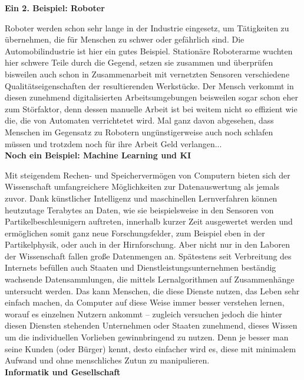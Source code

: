 {    

    \textbf{Ein 2. Beispiel: Roboter}

    Roboter werden schon sehr lange in der Industrie eingesetz, um Tätigkeiten zu übernehmen, die für Menschen zu schwer oder gefährlich sind. Die Automobilindustrie ist hier ein gutes Beispiel. Stationäre Roboterarme wuchten hier schwere Teile durch die Gegend, setzen sie zusammen und überprüfen bisweilen auch schon in Zusammenarbeit mit vernetzten Sensoren verschiedene Qualitätseigenschaften der resultierenden Werkstücke. Der Mensch verkommt in diesen zunehmend digitalisierten Arbeitsumgebungen beisweilen sogar schon eher zum Störfaktor, denn dessen manuelle Arbeit ist bei weitem nicht so effizient wie die, die von Automaten verrichtetet wird. Mal ganz davon abgesehen, dass Menschen im Gegensatz zu Robotern ungünstigerweise auch noch schlafen müssen und trotzdem noch für ihre Arbeit Geld verlangen...\\

    \textbf{Noch ein Beispiel: Machine Learning und KI}

    Mit steigendem Rechen- und Speichervermögen von Computern bieten sich der Wissenschaft umfangreichere Möglichkeiten zur Datenauswertung als jemals zuvor. Dank künstlicher Intelligenz und maschinellen Lernverfahren können heutzutage Terabytes an Daten, wie sie beispielsweise in den Sensoren von Partikelbeschleunigern auftreten, innerhalb kurzer Zeit ausgewertet werden und ermöglichen somit ganz neue Forschungsfelder, zum Beispiel eben in der Partikelphysik, oder auch in der Hirnforschung. Aber nicht nur in den Laboren der Wissenschaft fallen große Datenmengen an. Spätestens seit Verbreitung des Internets befüllen auch Staaten und Dienstleistungsunternehmen beständig wachsende Datensammlungen, die mittels Lernalgorithmen auf Zusammenhänge untersucht werden. Das kann Menschen, die diese Dienste nutzen, das Leben sehr einfach machen, da Computer auf diese Weise immer besser verstehen lernen, worauf es einzelnen Nutzern ankommt -- zugleich versuchen jedoch die hinter diesen Diensten stehenden Unternehmen oder Staaten zunehmend, dieses Wissen um die individuellen Vorlieben gewinnbringend zu nutzen. Denn je besser man seine Kunden (oder Bürger) kennt, desto einfacher wird es, diese mit minimalem Aufwand und ohne menschliches Zutun zu manipulieren.\\

    \textbf{Informatik und Gesellschaft}

}
